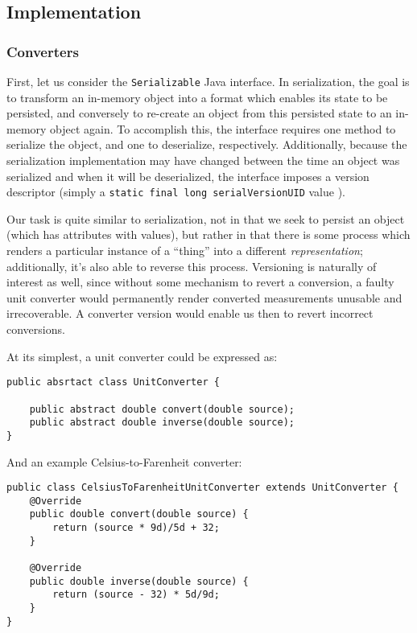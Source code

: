 \subsection{Implementation}\label{implementation}

\subsubsection{Converters}\label{converters}

First, let us consider the \texttt{Serializable} Java interface. In
serialization, the goal is to transform an in-memory object into a
format which enables its state to be persisted, and conversely to
re-create an object from this persisted state to an in-memory object
again. To accomplish this, the interface requires one method to
serialize the object, and one to deserialize, respectively.
Additionally, because the serialization implementation may have changed
between the time an object was serialized and when it will be
deserialized, the interface imposes a version descriptor (simply a
\texttt{static\ final\ long\ serialVersionUID} value ).

Our task is quite similar to serialization, not in that we seek to
persist an object (which has attributes with values), but rather in that
there is some process which renders a particular instance of a ``thing''
into a different \emph{representation}; additionally, it's also able to
reverse this process. Versioning is naturally of interest as well, since
without some mechanism to revert a conversion, a faulty unit converter
would permanently render converted measurements unusable and
irrecoverable. A converter version would enable us then to revert
incorrect conversions.

At its simplest, a unit converter could be expressed as:

\begin{verbatim}
public absrtact class UnitConverter {

    public abstract double convert(double source);
    public abstract double inverse(double source);
}
\end{verbatim}

And an example Celsius-to-Farenheit converter:

\begin{verbatim}
public class CelsiusToFarenheitUnitConverter extends UnitConverter {
    @Override
    public double convert(double source) {
        return (source * 9d)/5d + 32;
    }

    @Override
    public double inverse(double source) {
        return (source - 32) * 5d/9d;
    }
}
\end{verbatim}

